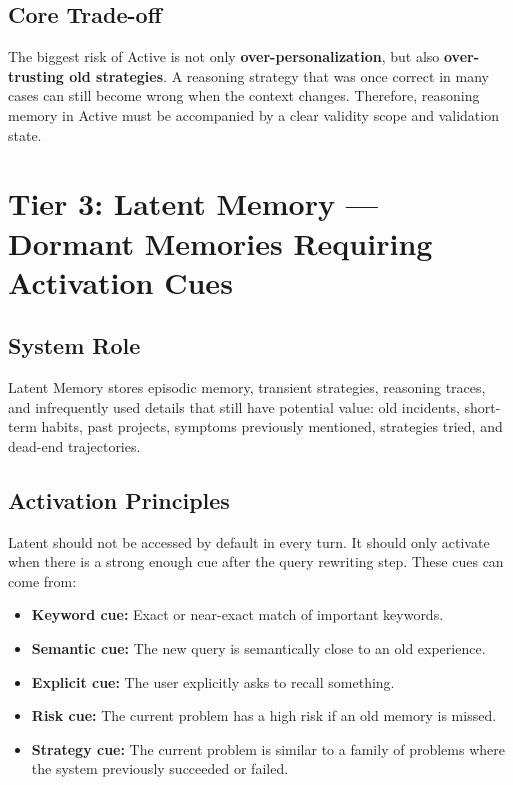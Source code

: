\documentclass[a4paper,12pt]{article}
\begin{document}
\subsection*{Core Trade-off}

The biggest risk of Active is not only \textbf{over-personalization}, but also \textbf{over-trusting old strategies}. A reasoning strategy that was once correct in many cases can still become wrong when the context changes. Therefore, reasoning memory in Active must be accompanied by a clear validity scope and validation state.

\section{Tier 3: Latent Memory --- Dormant Memories Requiring Activation Cues}

\subsection*{System Role}

Latent Memory stores episodic memory, transient strategies, reasoning traces, and infrequently used details that still have potential value: old incidents, short-term habits, past projects, symptoms previously mentioned, strategies tried, and dead-end trajectories.

\subsection*{Activation Principles}

Latent should not be accessed by default in every turn. It should only activate when there is a strong enough cue after the query rewriting step. These cues can come from:
\begin{itemize}
    \item \textbf{Keyword cue:} Exact or near-exact match of important keywords.
    \item \textbf{Semantic cue:} The new query is semantically close to an old experience.
    \item \textbf{Explicit cue:} The user explicitly asks to recall something.
    \item \textbf{Risk cue:} The current problem has a high risk if an old memory is missed.
    \item \textbf{Strategy cue:} The current problem is similar to a family of problems where the system previously succeeded or failed.
\end{itemize}
\end{document}
